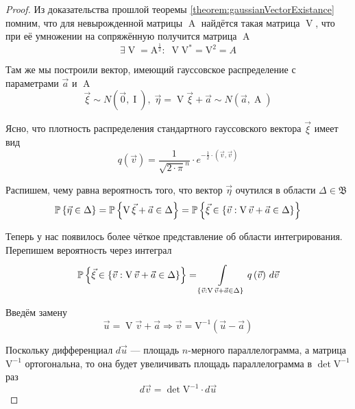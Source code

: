 \begin{proof}
    Из доказательства прошлой теоремы \ref{theorem:gaussianVectorExistance}
    помним, что для невырожденной матрицы $\operatorname{A}$ найдётся такая матрица
    $\operatorname{V}$, что при её умножении на сопряжённую получится матрица
    $\operatorname{A}$
    $$\exists \operatorname{V} = \operatorname{A^{\frac{1}{2}}}:\;
        \operatorname{V}\operatorname{V^*} = \operatorname{V^2} = A$$

    Там же мы построили вектор, имеющий гауссовское распределение с параметрами
    $\vec{a}$ и $\operatorname{A}$
    $$\vec{\xi} \sim N\left( \vec{0}, \operatorname{I} \right),\;
        \vec{\eta} = \operatorname{V} \vec{\xi} +\vec{a}
            \sim N\left( \vec{a}, \operatorname{A} \right)$$

    Ясно, что плотность распределения стандартного гауссовского вектора
    $\vec{\xi}$ имеет вид
    $$q\left( \vec{v} \right)
        = \frac{1}{\sqrt{2 \cdot \pi}^n}
            \cdot e^{-\frac{1}{2} \cdot \left( \vec{v}, \vec{v} \right)}$$

    Распишем, чему равна вероятность того, что вектор $\vec{\eta}$ очутился
    в области $\Delta \in \mathfrak{B}$
    \begin{equation}\label{eq:gaussVectorProbabilityStart}
        \Probability{\vec{\eta} \in \Delta}
        = \Probability{\operatorname{V} \vec{\xi} + \vec{a} \in \Delta}
        = \Probability{\vec{\xi} \in \left\{ \vec{v}:
            \operatorname{V} \vec{v} + \vec{a} \in \Delta \right\}}
    \end{equation}

    Теперь у нас появилось более чёткое представление об области интегрирования.
    Перепишем вероятность через интеграл
    $$\Probability{\vec{\xi} \in \left\{ \vec{v}:
            \operatorname{V} \vec{v} + \vec{a} \in \Delta \right\}}
        = \integrall{\left\{ \vec{v}: \operatorname{V} \vec{v} + \vec{a}
            \in \Delta \right\}}{d\vec{v}}{q\left( \vec{v} \right)}$$

    Введём замену
    $$\vec{u} = \operatorname{V} \vec{v} + \vec{a}
        \Rightarrow
        \vec{v} = \operatorname{V^{-1}} \left( \vec{u} - \vec{a} \right)$$

    Поскольку дифференциал $d\vec{u}$ --- площадь $n$-мерного параллелограмма,
    а матрица $\operatorname{V^{-1}}$ ортогональна, то она будет увеличивать
    площадь параллелограмма в $\det{\operatorname{V^{-1}}}$ раз
    $$d\vec{v} = \det{\operatorname{V^{-1}}} \cdot d\vec{u}$$


\end{proof}
